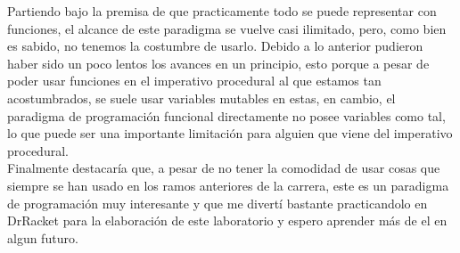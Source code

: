 Partiendo bajo la premisa de que practicamente todo se puede representar con funciones, el alcance 
de este paradigma se vuelve casi ilimitado, pero, como bien es sabido, no tenemos la costumbre de usarlo. 
Debido a lo anterior pudieron haber sido un poco lentos los avances en un principio, esto porque a pesar de poder usar 
funciones en el imperativo procedural al que estamos tan acostumbrados, se suele usar variables mutables en estas, en cambio, el paradigma 
de programación funcional directamente no posee variables como tal, lo que puede ser una importante limitación para 
alguien que viene del imperativo procedural.\\

Finalmente destacaría que, a pesar de no tener la comodidad de usar cosas que siempre se han usado en los ramos anteriores de la carrera, este 
es un paradigma de programación muy interesante y que me divertí bastante practicandolo en DrRacket para la elaboración de este laboratorio y espero 
aprender más de el en algun futuro.